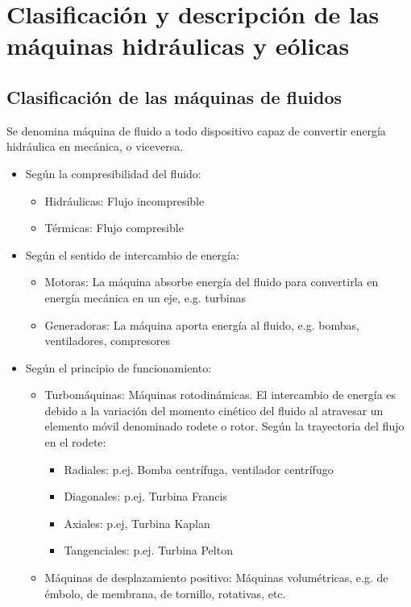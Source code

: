 \chapter{Clasificación y descripción de las máquinas hidráulicas y eólicas}
\section{Clasificación de las máquinas de fluidos}
Se denomina máquina de fluido a todo dispositivo capaz de convertir energía hidráulica en mecánica, o viceversa.

\begin{itemize}
    \item Según la compresibilidad del fluido:
    \begin{itemize}
        \item Hidráulicas: Flujo incompresible
        \item Térmicas: Flujo compresible
    \end{itemize}
    \item Según el sentido de intercambio de energía:
    \begin{itemize}
        \item Motoras: La máquina absorbe energía del fluido para convertirla en energía mecánica en un eje, e.g. turbinas
        \item Generadoras: La máquina aporta energía al fluido, e.g. bombas, ventiladores, compresores
    \end{itemize}
    \item Según el principio de funcionamiento:
    \begin{itemize}
        \item Turbomáquinas: Máquinas rotodinámicas. El intercambio de energía es debido a la variación del momento cinético del fluido al atravesar un elemento móvil denominado rodete o rotor.
        Según la trayectoria del flujo en el rodete:
        \begin{itemize}
            \item Radiales: p.ej. Bomba centrífuga, ventilador centrífugo
            \item Diagonales: p.ej. Turbina Francis
            \item Axiales: p.ej, Turbina Kaplan
            \item Tangenciales: p.ej. Turbina Pelton
        \end{itemize}
        \item Máquinas de desplazamiento positivo: Máquinas volumétricas, e.g. de émbolo, de membrana, de tornillo, rotativas, etc.
    \end{itemize}
\end{itemize}

